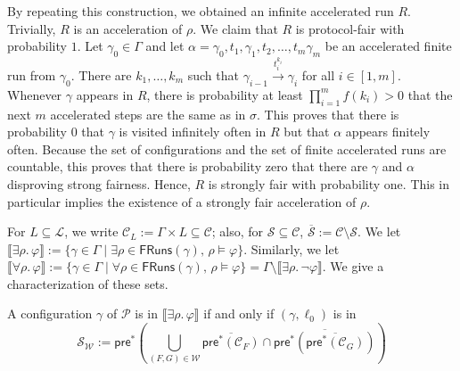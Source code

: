 \documentclass[10pt,a4paper]{article}
\newcommand{\set}[1]{\{#1\}}
\newcommand{\nset}[2]{[#1,#2]}
\newcommand{\deff}{:=}
\newcommand{\accrun}{\alpha}
\newcommand{\fairrunsfrom}[1]{\mathsf{FRuns}(#1)}
\newcommand{\config}{\gamma}
\newcommand{\configs}{\Gamma}
\newcommand{\preop}{\mathsf{pre}}
\newcommand{\prestar}[1]{\preop^*(#1)}
\newcommand{\step}[1]{\xrightarrow{#1}}
\newcommand{\run}{\rho}
\newcommand*{\atrans}{t}
\newcommand{\satset}[1]{\llbracket {#1} \rrbracket}
\newcommand{\PP}{\mathcal{P}}                  %
\newcommand{\cSet}{\mathcal{S}}  %
\newcommand{\bstates}{\mathcal{L}}
\newcommand*{\abuchistate}{\ell}
\newcommand*{\bstate}{\abuchistate}
\newcommand*{\binitstate}{\bstate_0}
\newcommand*{\bwinning}{\mathcal{W}}
\newcommand{\prodconfigs}{\mathcal{C}}
\newcommand{\prodconfigsproj}[1]{\prodconfigs_{#1}}
\newcommand*{\setcomplement}[1]{\overline{#1}}
\newcommand{\ltlgre}{\cSet_\bwinning}
\begin{document}
\begin{appendixproof}
	By repeating this construction, we obtained an infinite accelerated run \(R\).
	Trivially, \(R\) is an acceleration of \(\run\).
	We claim that \(R\) is protocol-fair with probability \(1\).
	Let \(\config_0 \in \configs\) and let \(\accrun = \config_0, \atrans_1, \config_1, \atrans_2, \dots, \atrans_m \config_m\) be an accelerated finite run from \(\config_0\).
	There are \(k_1, \dots, k_m\) such that \(\config_{i-1} \step{\atrans_i^{k_i}} \config_i\) for all \(i \in \nset{1}{m}\).
	Whenever \(\config\) appears in \(R\), there is probability at least \(\prod_{i=1}^{m} f(k_i)>0\) that the next \(m\) accelerated steps are the same as in \(\sigma\).
	This proves that there is probability \(0\) that \(\config\) is visited infinitely often in \(R\) but that \(\accrun\) appears finitely often.
	Because the set of configurations and the set of finite accelerated runs are countable, this proves that there is probability zero that there are \(\config\) and \(\accrun\) disproving strong fairness.
	Hence, \(R\) is strongly fair with probability one.
	This in particular implies the existence of a strongly fair acceleration of \(\run\).
\end{appendixproof}

For \(L \subseteq \bstates\), we write \(\prodconfigsproj{L} \deff \configs \times L \subseteq \prodconfigs\); also, for \(\cSet \subseteq \prodconfigs\), \(\setcomplement{\cSet} \deff \prodconfigs \setminus \cSet\).
We let \(\satset{\exists \run .
	\, \varphi} \deff \set{\config \in \configs \mid \exists \run \in \fairrunsfrom{\config}, \, \run \models \varphi}\).
Similarly, we let \(\satset{\forall \run .
	\, \varphi} \deff \set{\config \in \configs \mid \forall \run \in \fairrunsfrom{\config}, \, \run \models \varphi} = \configs \setminus {\satset{\exists \run . \, \neg \varphi}}\).
We give a characterization of these sets.

\begin{theorem}
	\label{lm:characterization}
	A configuration \(\config\) of \(\PP\) is in \(\satset{\exists \run .
		\, \varphi}\) if and only if \((\config,\binitstate)\) is in
	\[
		\ltlgre \deff \preop^* \left( \textstyle{\bigcup_{(F, G) \in \bwinning}} \setcomplement{\prestar{\prodconfigsproj{F}}} \cap \setcomplement{\prestar{\setcomplement{\prestar{\prodconfigsproj{G}}}}} \right)
	\]
\end{theorem}
\end{document}
